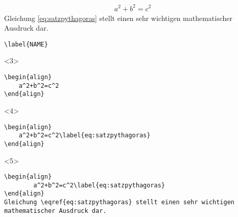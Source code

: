 \begin{frame}[fragile]
	\Ausgabe
	\begin{outputbox}
		\begin{align}
			a^2+b^2=c^2\label{eq:satzpythagoras}
		\end{align}
		Gleichung \eqref{eq:satzpythagoras} stellt einen sehr wichtigen mathematischer Ausdruck dar.
	\end{outputbox}
	
	
	\pause
	\begin{lstlisting}
\label{NAME}
	\end{lstlisting}
	
	\pause
	\Code
	\begin{onlyenv}
		\begin{lstlisting}
\begin{align}
	a^2+b^2=c^2
\end{align}
		\end{lstlisting}
	\end{onlyenv}
	\begin{onlyenv}
		\begin{lstlisting}
\begin{align}
	a^2+b^2=c^2\label{eq:satzpythagoras}
\end{align}
		\end{lstlisting}
	\end{onlyenv}
	\begin{onlyenv}
		\begin{lstlisting}
\begin{align}
		a^2+b^2=c^2\label{eq:satzpythagoras}
\end{align}
Gleichung \eqref{eq:satzpythagoras} stellt einen sehr wichtigen mathematischer Ausdruck dar.
		\end{lstlisting}
	\end{onlyenv}
\end{frame}
